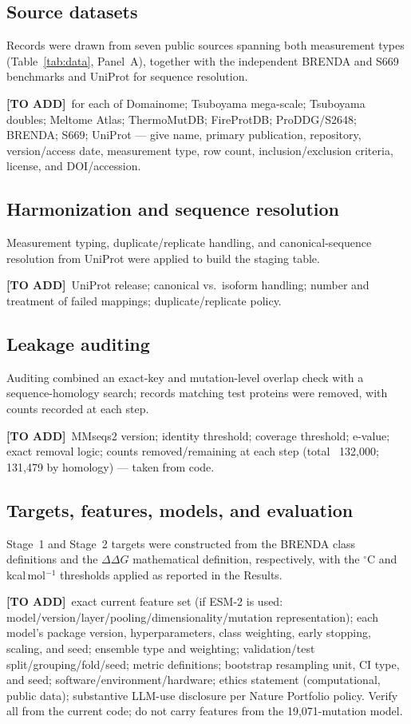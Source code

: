 \documentclass[11pt]{article}
\newcommand{\fillerblock}[1]{%
  \par\smallskip\noindent
  \colorbox{filleryellow}{\parbox{\dimexpr\linewidth-2\fboxsep\relax}{%
    \small\textbf{[TO ADD]}\ #1}}\par\smallskip}
\newcommand{\ddg}{\ensuremath{\Delta\Delta G}}
\newcommand{\degC}{\ensuremath{^{\circ}}C}
\begin{document}
\subsection{Source datasets}
Records were drawn from seven public sources spanning both measurement types
(Table~\ref{tab:data}, Panel~A), together with the independent BRENDA and S669 benchmarks and
UniProt for sequence resolution.
\fillerblock{for each of Domainome; Tsuboyama mega-scale; Tsuboyama doubles; Meltome Atlas; ThermoMutDB; FireProtDB; ProDDG/S2648; BRENDA; S669; UniProt --- give name, primary publication, repository, version/access date, measurement type, row count, inclusion/exclusion criteria, license, and DOI/accession.}

\subsection{Harmonization and sequence resolution}
Measurement typing, duplicate/replicate handling, and canonical-sequence resolution from UniProt
were applied to build the staging table.
\fillerblock{UniProt release; canonical vs.\ isoform handling; number and treatment of failed mappings; duplicate/replicate policy.}

\subsection{Leakage auditing}
Auditing combined an exact-key and mutation-level overlap check with a sequence-homology search;
records matching test proteins were removed, with counts recorded at each step.
\fillerblock{MMseqs2 version; identity threshold; coverage threshold; e-value; exact removal logic; counts removed/remaining at each step (total ~132{,}000; 131{,}479 by homology) --- taken from code.}

\subsection{Targets, features, models, and evaluation}
Stage~1 and Stage~2 targets were constructed from the BRENDA class definitions and the \ddg{}
mathematical definition, respectively, with the \degC{} and kcal\,mol$^{-1}$ thresholds applied as
reported in the Results.
\fillerblock{exact current feature set (if ESM-2 is used: model/version/layer/pooling/dimensionality/mutation representation); each model's package version, hyperparameters, class weighting, early stopping, scaling, and seed; ensemble type and weighting; validation/test split/grouping/fold/seed; metric definitions; bootstrap resampling unit, CI type, and seed; software/environment/hardware; ethics statement (computational, public data); substantive LLM-use disclosure per Nature Portfolio policy. Verify all from the current code; do not carry features from the 19,071-mutation model.}
\end{document}
